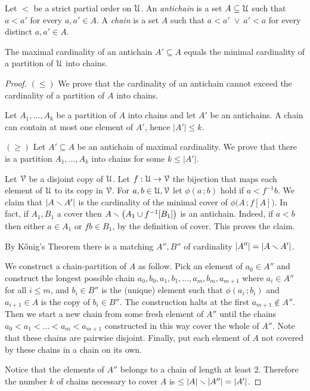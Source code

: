 \documentclass[scombinatorics.tex]{subfiles}
\begin{document}
Let $<$ be a strict partial order on $\EuScript U$. An \emph{antichain\/} is a set $A\subseteq\EuScript U$ such that $a<a'$ for every $a,a'\in A$. A \emph{chain\/} is a set $A$ such that $a<a'\;\vee\ a'<a$ for every distinct $a,a'\in A$.

\begin{void_thm}
   The maximal cardinality of an antichain $A'\subseteq A$ equals the minimal cardinality of a partition of $\EuScript U$ into chains. 
\end{void_thm}

\begin{proof}
  $(\le)$ 
  We prove that the cardinality of an antichain cannot exceed the cardinality of a partition of $A$ into chains.

  Let $A_1,\dots,A_k$ be a partition of $A$ into chains and let $A'$ be an antichains.
  A chain can contain at most one element of $A'$, hence $|A'|\le k$.

  $(\ge)$  
  Let $A'\subseteq A$ be an antichain of maximal cardinality.
  We prove that there is a partition $A_1,\dots,A_k$ into chains for some $k\le|A'|$.


  Let $\EuScript V$ be a disjoint copy of $\EuScript U$.
  Let $f:\EuScript U\to\EuScript V$ the bijection that maps each element of $\EuScript U$ to its copy in $\EuScript V$.
  For $a,b\in\EuScript U,\EuScript V$ let $\phi(a\,;b)$ hold if $a< f^{-1}b$.
  We claim that $|A\smallsetminus A'|$ is the cardinality of the minimal cover of $\phi\big(A\,;f[A]\big)$. 
  In fact, if $A_1,B_1$ a cover then $A \smallsetminus \big(A_1\cup f^{-1}[B_1]\big)$ is an antichain.
  Indeed, if $a<b$ then either $a\in A_1$ or $fb\in B_1$, by the definition of cover.
  This proves the claim.

  By K\H{o}nig's Theorem there is a matching $A'',B''$ of cardinality $|A''|=|A\smallsetminus A'|$.

  We construct a chain-partition of $A$ as follow.
  Pick an element of $a_0\in A''$ and construct the longest possible chain $a_0,b_0,a_1,b_1,\dots,a_m,b_m,a_{m+1}$ where $a_i\in A''$ for all $i\le m$, and $b_i\in B''$ is the (unique) element such that $\phi(a_i\,;b_i)$ and $a_{i+1}\in A$ is the copy of $b_i\in B''$.
  The construction halts at the first $a_{m+1}\not\in A''$.
  Then we start a new chain from some fresh element of $A''$ until the chains $a_0<a_1<\dots<a_m<a_{m+1}$ constructed in this way cover the whole of $A''$.
  Note that these chains are pairwise disjoint.
  Finally, put each element of $A$ not covered by these chains in a chain on its own.
  
  Notice that the elements of $A''$ belongs to a chain of length at least 2.
  Therefore the number $k$ of chains necessary to cover $A$ is $\le |A|\smallsetminus |A''| =  |A'|$.
\end{proof}
\end{document}
